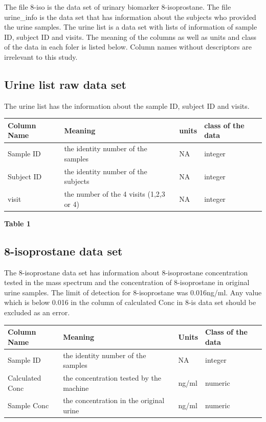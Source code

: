 \documentclass[12pt,]{article}
\begin{document}
The file 8-iso is the data set of urinary biomarker 8-isoprostane. The
file urine\_info is the data set that has information about the subjects
who provided the urine samples. The urine list is a data set with lists
of information of sample ID, subject ID and visits. The meaning of the
columns as well as units and class of the data in each foler is listed
below. Column names without descriptors are irrelevant to this study.

\hypertarget{urine-list-raw-data-set}{%
\subsection{Urine list raw data set}\label{urine-list-raw-data-set}}

The urine list has the information about the sample ID, subject ID and
visits.

\begin{longtable}[]{@{}llll@{}}
\toprule
Column Name & Meaning & units & class of the data\tabularnewline
\midrule
\endhead
Sample ID & the identity number of the samples & NA &
integer\tabularnewline
Subject ID & the identity number of the subjects & NA &
integer\tabularnewline
visit & the number of the 4 visits (1,2,3 or 4) & NA &
integer\tabularnewline
\bottomrule
\end{longtable}

\center \textbf{Table 1} \center 

\hypertarget{isoprostane-data-set}{%
\subsection{8-isoprostane data set}\label{isoprostane-data-set}}

The 8-isoprostane data set has information about 8-isoprostane
concentration tested in the mass spectrum and the concentration of
8-isoprostane in original urine samples. The limit of detection for
8-isoprostane was 0.016ng/ml. Any value which is below 0.016 in the
column of calculated Conc in 8-is data set should be excluded as an
error.

\begin{longtable}[]{@{}llll@{}}
\toprule
Column Name & Meaning & Units & Class of the data\tabularnewline
\midrule
\endhead
Sample ID & the identity number of the samples & NA &
integer\tabularnewline
Calculated Conc & the concentration tested by the machine & ng/ml &
numeric\tabularnewline
Sample Conc & the concentration in the original urine & ng/ml &
numeric\tabularnewline
\bottomrule
\end{longtable}
\end{document}
